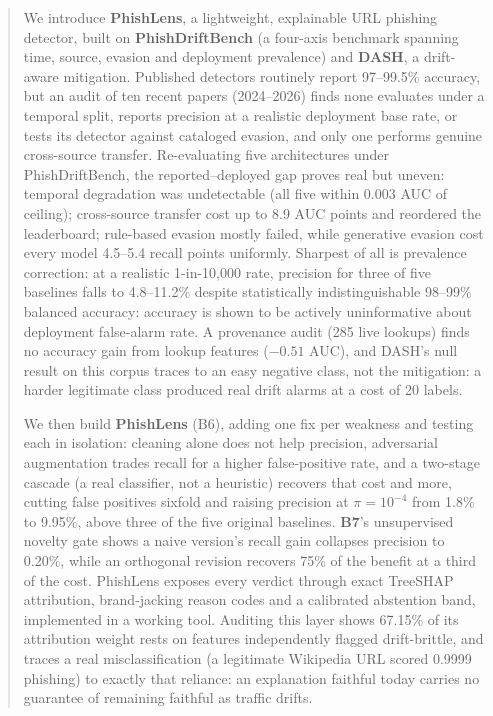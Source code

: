 \documentclass[conference]{IEEEtran}
\begin{document}
\begin{abstract}
We introduce \textbf{PhishLens}, a lightweight, explainable URL phishing
detector, built on \textbf{PhishDriftBench} (a four-axis benchmark spanning time,
source, evasion and deployment prevalence) and \textbf{DASH}, a
drift-aware mitigation. Published detectors routinely
report 97--99.5\% accuracy, but an audit of ten recent papers (2024--2026)
finds none evaluates under a temporal split, reports precision at a
realistic deployment base rate, or tests its detector against cataloged
evasion, and only one performs genuine cross-source transfer.
Re-evaluating five architectures under PhishDriftBench, the
reported--deployed gap proves real but uneven: temporal degradation was
undetectable (all five within 0.003 AUC of ceiling); cross-source
transfer cost up to 8.9 AUC points and reordered the leaderboard; rule-based
evasion mostly failed, while generative evasion cost every model 4.5--5.4
recall points uniformly. Sharpest of all is prevalence correction: at a
realistic 1-in-10{,}000 rate, precision for three of five baselines falls
to 4.8--11.2\% despite statistically indistinguishable 98--99\% balanced accuracy: accuracy is shown to be actively uninformative
about deployment false-alarm rate. A provenance audit (285 live lookups) finds
no accuracy gain from lookup features ($-0.51$ AUC), and DASH's null
result on this corpus traces to an easy negative class, not the
mitigation: a harder legitimate class produced real drift alarms at a
cost of 20 labels.

We then build \textbf{PhishLens} (B6), adding one fix per weakness and
testing each in isolation: cleaning alone does not help precision,
adversarial augmentation trades recall for a higher false-positive rate,
and a two-stage cascade (a real classifier, not a heuristic) recovers that
cost and more, cutting false positives sixfold and raising precision
at $\pi{=}10^{-4}$ from 1.8\% to 9.95\%, above three of the five original
baselines. \textbf{B7}'s unsupervised novelty gate shows a naive
version's recall gain collapses precision to 0.20\%, while an orthogonal
revision recovers 75\% of the benefit at a third of the cost. PhishLens
exposes every verdict through exact TreeSHAP attribution, brand-jacking
reason codes and a calibrated abstention band, implemented in a working
tool. Auditing this layer shows 67.15\% of its attribution weight rests
on features independently flagged drift-brittle, and traces a real misclassification (a legitimate Wikipedia URL scored 0.9999
phishing) to exactly that reliance: an explanation faithful today carries no
guarantee of remaining faithful as traffic drifts.
\end{abstract}
\end{document}
